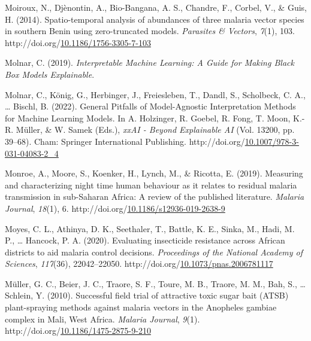 \documentclass[12pt,twoside]{reedthesis}
\newlength{\cslhangindent}
\newenvironment{CSLReferences}[2] %
 {%
  \setlength{\parindent}{0pt}
  \ifodd #1 \everypar{\setlength{\hangindent}{\cslhangindent}}\ignorespaces\fi
  \ifnum #2 > 0
  \setlength{\parskip}{#2\baselineskip}
  \fi
 }%
 {}
\begin{document}
\begin{CSLReferences}{1}{0}
\leavevmode{}%
Moiroux, N., Djènontin, A., Bio-Bangana, A. S., Chandre, F., Corbel, V., \& Guis, H. (2014). Spatio-temporal analysis of abundances of three malaria vector species in southern {Benin} using zero-truncated models. \emph{Parasites \& Vectors}, \emph{7}(1), 103. http://doi.org/\href{https://doi.org/10.1186/1756-3305-7-103}{10.1186/1756-3305-7-103}

\leavevmode{}%
Molnar, C. (2019). \emph{Interpretable {Machine} {Learning}: {A} {Guide} for {Making} {Black} {Box} {Models} {Explainable}}.

\leavevmode{}%
Molnar, C., König, G., Herbinger, J., Freiesleben, T., Dandl, S., Scholbeck, C. A., \ldots{} Bischl, B. (2022). General {Pitfalls} of {Model}-{Agnostic} {Interpretation} {Methods} for {Machine} {Learning} {Models}. In A. Holzinger, R. Goebel, R. Fong, T. Moon, K.-R. Müller, \& W. Samek (Eds.), \emph{{xxAI} - {Beyond} {Explainable} {AI}} (Vol. 13200, pp. 39--68). Cham: Springer International Publishing. http://doi.org/\href{https://doi.org/10.1007/978-3-031-04083-2_4}{10.1007/978-3-031-04083-2\_4}

\leavevmode{}%
Monroe, A., Moore, S., Koenker, H., Lynch, M., \& Ricotta, E. (2019). Measuring and characterizing night time human behaviour as it relates to residual malaria transmission in sub-{Saharan} {Africa}: A review of the published literature. \emph{Malaria Journal}, \emph{18}(1), 6. http://doi.org/\href{https://doi.org/10.1186/s12936-019-2638-9}{10.1186/s12936-019-2638-9}

\leavevmode{}%
Moyes, C. L., Athinya, D. K., Seethaler, T., Battle, K. E., Sinka, M., Hadi, M. P., \ldots{} Hancock, P. A. (2020). Evaluating insecticide resistance across {African} districts to aid malaria control decisions. \emph{Proceedings of the National Academy of Sciences}, \emph{117}(36), 22042--22050. http://doi.org/\href{https://doi.org/10.1073/pnas.2006781117}{10.1073/pnas.2006781117}

\leavevmode{}%
Müller, G. C., Beier, J. C., Traore, S. F., Toure, M. B., Traore, M. M., Bah, S., \ldots{} Schlein, Y. (2010). Successful field trial of attractive toxic sugar bait ({ATSB}) plant-spraying methods against malaria vectors in the {Anopheles} gambiae complex in {Mali}, {West} {Africa}. \emph{Malaria Journal}, \emph{9}(1). http://doi.org/\href{https://doi.org/10.1186/1475-2875-9-210}{10.1186/1475-2875-9-210}


\end{CSLReferences}
\end{document}

